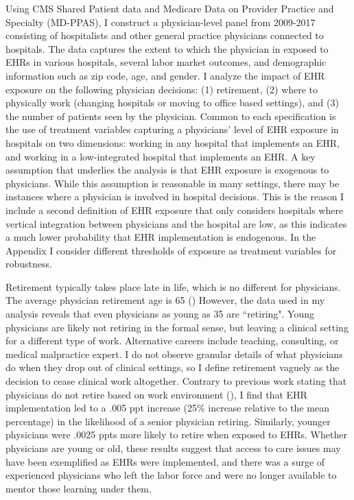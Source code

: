 \documentclass[11pt]{article}
\begin{document}
Using CMS Shared Patient data and Medicare Data on Provider Practice and Specialty (MD-PPAS), I construct a physician-level panel from 2009-2017 consisting of hospitalists and other general practice physicians connected to hospitals. The data captures the extent to which the physician in exposed to EHRs in various hospitals, several labor market outcomes, and demographic information such as zip code, age, and gender. I analyze the impact of EHR exposure on the following physician decisions: (1) retirement, (2) where to physically work (changing hospitals or moving to office based settings), and (3) the number of patients seen by the physician. Common to each specification is the use of treatment variables capturing a physicians' level of EHR exposure in hospitals on two dimensions: working in any hospital that implements an EHR, and working in a low-integrated hospital that implements an EHR. A key assumption that underlies the analysis is that EHR exposure is exogenous to physicians. While this assumption is reasonable in many settings, there may be instances where a physician is involved in hospital decisions. This is the reason I include a second definition of EHR exposure that only considers hospitals where vertical integration between physicians and the hospital are low, as this indicates a much lower probability that EHR implementation is endogenous. In the Appendix I consider different thresholds of exposure as treatment variables for robustness. 

Retirement typically takes place late in life, which is no different for physicians. The average physician retirement age is 65 (\cite{collier2017challenges}) However, the data used in my analysis reveals that even physicians as young as 35 are ``retiring". Young physicians are likely not retiring in the formal sense, but leaving a clinical setting for a different type of work. Alternative careers include teaching, consulting, or medical malpractice expert. I do not observe granular details of what physicians do when they drop out of clinical settings, so I define retirement vaguely as the decision to cease clinical work altogether. Contrary to previous work stating that physicians do not retire based on work environment (\cite{Bahrami2002}), I find that EHR implementation led to a .005 ppt increase (25\% increase relative to the mean percentage) in the likelihood of a senior physician retiring. Similarly, younger physicians were .0025 ppts more likely to retire when exposed to EHRs. Whether physicians are young or old, these results suggest that access to care issues may have been exemplified as EHRs were implemented, and there was a surge of experienced physicians who left the labor force and were no longer available to mentor those learning under them.
\end{document}

